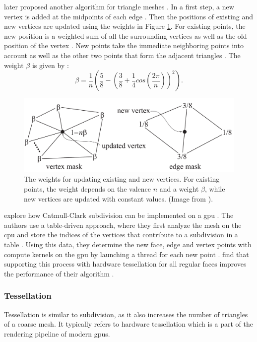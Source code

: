 \citeauthor{loop_subdivision} later proposed another algorithm for triangle meshes \cite{loop_subdivision}.
In a first step, a new vertex is added at the midpoints of each edge \cite{loop_subdivision}.
Then the positions of existing and new vertices are updated using the weights in Figure \ref{fig:loop_subdivision}.
For existing points, the new position is a weighted sum of all the surrounding vertices as well as the old position of the vertex \cite{loop_subdivision}.
New points take the immediate neighboring points into account as well as the other two points that form the adjacent triangles \cite{loop_subdivision}.
The weight $\beta$ is given by \cite{loop_subdivision}:
\begin{equation*}
    \beta = \frac{1}{n}(\frac{5}{8} - (\frac{3}{8} + \frac{1}{4}cos(\frac{2\pi}{n}))^2).
\end{equation*}
\begin{figure}[ht]
    \centering
    \includegraphics[width=0.5\linewidth]{img/loop_subdivision.png}
    \caption[Weights in Loop subdivision]{The weights for updating existing and new vertices. For existing points, the weight depends on the valence $n$ and a weight $\beta$, while new vertices are updated with constant values. (Image from \cite{realtime}).}
    \label{fig:loop_subdivision}
\end{figure}

\citeauthor{niessner_subdivision} explore how Catmull-Clark subdivision can be implemented on a \ac{gpu} \cite{niessner_subdivision}.
The authors use a table-driven approach, where they first analyze the mesh on the \ac{cpu} and store the indices of the vertices that contribute to a subdivision in a table \cite{niessner_subdivision}.
Using this data, they determine the new face, edge and vertex points with compute kernels on the \ac{gpu} by launching a thread for each new point \cite{niessner_subdivision}.
\citeauthor{niessner_subdivision} find that supporting this process with hardware tessellation for all regular faces improves the performance of their algorithm \cite{niessner_subdivision}.


\subsubsection*{Tessellation}
Tessellation is similar to subdivision, as it also increases the number of triangles of a coarse mesh.
It typically refers to hardware tessellation which is a part of the rendering pipeline of modern \acp{gpu}.


